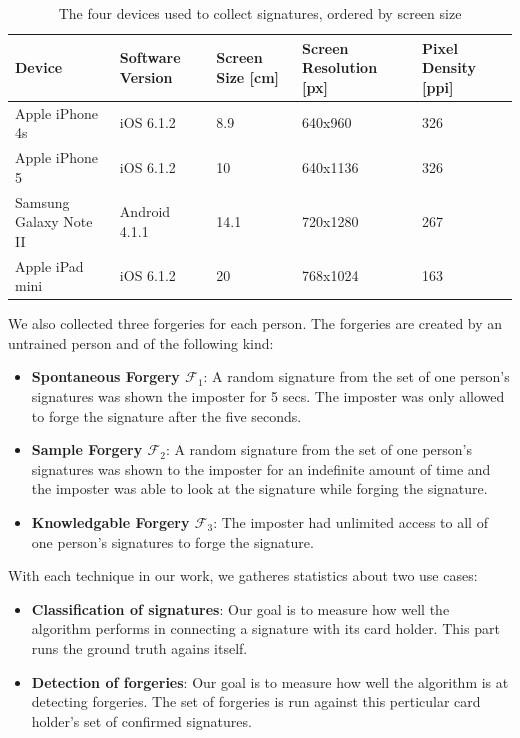 \documentclass[a4paper, oneside]{csthesis}
\begin{document}
\begin{table}[tb]
    \begin{center}
        \begin{tabular}{p{1.75cm}|p{2cm}p{2cm}p{2cm}p{2cm}}
        \hline

        \hline
        \textbf{Device} & \textbf{Software Version} & \textbf{Screen Size [cm]} & \textbf{Screen Resolution [px]} & \textbf{Pixel Density [ppi]} \\
        \hline
        Apple iPhone 4s & iOS 6.1.2 & 8.9 & 640x960 & 326 \\
        \hdashline[0.5pt/3pt]
        Apple iPhone 5 & iOS 6.1.2 & 10 & 640x1136 & 326 \\
        \hdashline[0.5pt/3pt]
        Samsung Galaxy Note II & Android 4.1.1 & 14.1 & 720x1280 & 267 \\
        \hdashline[0.5pt/3pt]
        Apple iPad mini & iOS 6.1.2 & 20 & 768x1024 & 163\\
        \hline
        \end{tabular}
    \end{center}
    \label{tbl:signatures-devices}
    \caption{The four devices used to collect signatures, ordered by screen size}
\end{table}

We also collected three forgeries for each person. The forgeries are created by an untrained person and of the following kind:

\begin{itemize}
\item \textbf{Spontaneous Forgery $\mathcal{F}_1$}: A random signature from the set of one person's signatures was shown the imposter for 5 secs. The imposter was only allowed to forge the signature after the five seconds.
\item \textbf{Sample Forgery $\mathcal{F}_2$}: A random signature from the set of one person's signatures was shown to the imposter for an indefinite amount of time and the imposter was able to look at the signature while forging the signature.
\item \textbf{Knowledgable Forgery $\mathcal{F}_3$}: The imposter had unlimited access to all of one person's signatures to forge the signature.
\end{itemize}

With each technique in our work, we gatheres statistics about two use cases:
\begin{itemize}
\item \textbf{Classification of signatures}: Our goal is to measure how well the algorithm performs in connecting a signature with its card holder. This part runs the ground truth agains itself.
\item \textbf{Detection of forgeries}: Our goal is to measure how well the algorithm is at detecting forgeries. The set of forgeries is run against this perticular card holder's set of confirmed signatures.
\end{itemize}
\end{document}
